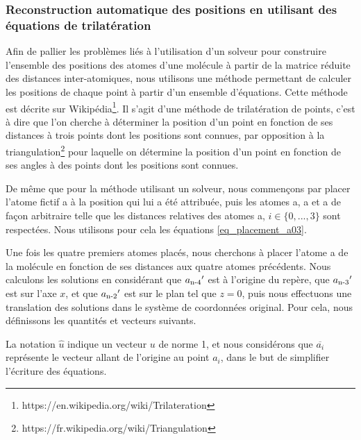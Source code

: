 \subsubsection{Reconstruction automatique des positions en utilisant des équations de trilatération}

\label{repr_mat_dist_rel_interat_trilat}

\par Afin de pallier les problèmes liés à l'utilisation d'un solveur pour construire l'ensemble des positions des atomes d'une molécule à partir de la matrice réduite des distances inter-atomiques, nous utilisons une méthode permettant de calculer les positions de chaque point à partir d'un ensemble d'équations. Cette méthode est décrite sur Wikipédia\footnote{https://en.wikipedia.org/wiki/Trilateration}. Il s'agit d'une méthode de trilatération de points, c'est à dire que l'on cherche à déterminer la position d'un point en fonction de ses distances à trois points dont les positions sont connues, par opposition à la triangulation\footnote{https://fr.wikipedia.org/wiki/Triangulation} pour laquelle on détermine la position d'un point en fonction de ses angles à des points dont les positions sont connues.\\

\par De même que pour la méthode utilisant un solveur, nous commençons par placer l'atome fictif a à la position qui lui a été attribuée, puis les atomes a, a et a de façon arbitraire telle que les distances relatives des atomes a, $i \in \{0, ..., 3\}$ sont respectées. Nous utilisons pour cela les équations \eqref{eq_placement_a03}.\\

\par Une fois les quatre premiers atomes placés, nous cherchons à placer l'atome a de la molécule en fonction de ses distances aux quatre atomes précédents. Nous calculons les solutions en considérant que $a\textsubscript{n-4}'$ est à l'origine du repère, que $a\textsubscript{n-3}'$ est sur l'axe $x$, et que $a\textsubscript{n-2}'$ est sur le plan tel que $z=0$, puis nous effectuons une translation des solutions dans le système de coordonnées original. Pour cela, nous définissons les quantités et vecteurs suivants. 
\par La notation $\hat{u}$ indique un vecteur $u$ de norme 1, et nous considérons que $\overline{a_i}$ représente le vecteur allant de l'origine au point $a_i$, dans le but de simplifier l'écriture des équations.\\

